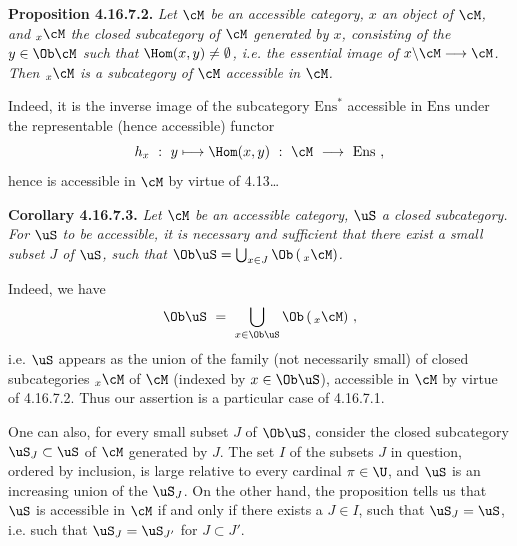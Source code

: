 \textbf{Proposition 4.16.7.2.} \textit{Let $\cM$ be an accessible category, $x$ an object of $\cM$, and ${}_x\cM$ the closed subcategory of $\cM$ generated by $x$, consisting of the $y \in \Ob \cM$ such that $\Hom(x,y) \neq \emptyset$, i.e. the essential image of $x\backslash\cM \longrightarrow \cM$. Then ${}_x\cM$ is a subcategory of $\cM$ accessible in $\cM$.}

Indeed, it is the inverse image of the subcategory $\mathrm{Ens}^*$ accessible in $\mathrm{Ens}$ under the representable (hence accessible) functor
\[
h_x \ :\ y \longmapsto \Hom(x,y) \ :\ \cM \ \longrightarrow\ \mathrm{Ens} \ ,
\]
hence is accessible in $\cM$ by virtue of 4.13\dots

\textbf{Corollary 4.16.7.3.} \textit{Let $\cM$ be an accessible category, $\uS$ a closed subcategory. For $\uS$ to be accessible, it is necessary and sufficient that there exist a \textup{small} subset $J$ of $\uS$, such that $\Ob \uS = \bigcup_{x\in J} \Ob\,(\,{}_x\cM)$.}

Indeed, we have
\[
\Ob \uS \ =\ \bigcup_{x\in\Ob\uS} \Ob\,(\,{}_x\cM) \ ,
\]
i.e. $\uS$ appears as the union of
the family (not necessarily small) of closed subcategories ${}_x\cM$ of $\cM$ (indexed by $x \in \Ob \uS$), accessible in $\cM$ by virtue of 4.16.7.2. Thus our assertion is a particular case of 4.16.7.1.


One can also, for every small subset $J$ of $\Ob \uS$, consider the closed subcategory $\uS_J \subset \uS$ of $\cM$ generated by $J$. The set $I$ of the subsets $J$ in question, ordered by inclusion, is large relative to every cardinal $\pi \in \U$, and $\uS$ is an increasing union of the $\uS_J$. On the other hand, the proposition tells us that $\uS$ is accessible in $\cM$ if and only if there exists a $J \in I$, such that $\uS_J = \uS$, i.e. such that $\uS_J = \uS_{J'}$ for $J \subset J'$.

